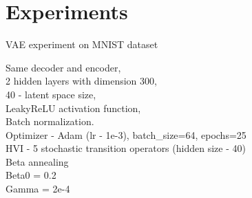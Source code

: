 \documentclass[10pt,letterpaper]{article}
\begin{document}


\section{Experiments}

VAE experiment on MNIST dataset

Same decoder and encoder, \\
2 hidden layers with dimension 300, \\
40 - latent space size, \\
LeakyReLU activation function, \\
Batch normalization. \\
Optimizer - Adam (lr - 1e-3), batch_size=64, epochs=25 \\
HVI - 5 stochastic transition operators (hidden size - 40) \\
Beta annealing \\
Beta0 = 0.2 \\
Gamma  = 2e-4 \\
\end{document}
